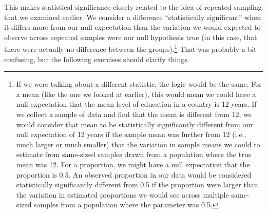 \documentclass[a4paper,12pt]{article}
\begin{document}
\begin{enumerate*}
This makes statistical significance closely related to the idea of repeated sampling that we examined earlier. We consider a difference ``statistically significant'' when it differs more from our null expectation than the variation we would expected to observe across repeated samples were our null hypothesis true (in this case, that there were actually no difference between the groups).\footnote{If we were talking about a different statistic, the logic would be the same. For a mean (like the one we looked at earlier), this would mean we could have a null expectation that the mean level of education in a country is 12 years. If we collect a sample of data and find that the mean is different from 12, we would consider that mean to be statistically significantly different from our null expectation of 12 years if the sample mean was further from 12 (i.e., much larger or much smaller) that the variation in sample means we could to estimate from same-sized samples drawn from a population where the true mean was 12. For a proportion, we might have a null expectation that the proportion is 0.5. An observed proportion in our data would be considered statistically significantly different from 0.5 if the proportion were larger than the variation in estimated proportions we would see across multiple same-sized samples from a population where the parameter was 0.5.} That was probably a bit confusing, but the following exercises should clarify things.

\item 










\end{enumerate*}
\end{document}
